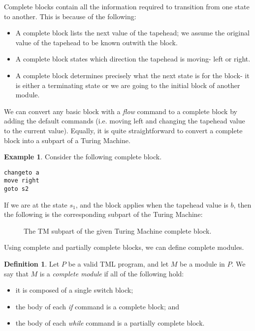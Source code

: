\documentclass{article}
\theoremstyle{definition}
\newtheorem{definition}[rules]{Definition}
\newtheorem{example}[rules]{Example}
\theoremstyle{plain}
\begin{document}
Complete blocks contain all the information required to transition from one state to another. This is because of the following:
\begin{itemize}
    \item A complete block lists the next value of the tapehead; we assume the original value of the tapehead to be known outwith the block.
    \item A complete block states which direction the tapehead is moving- left or right.
    \item A complete block determines precisely what the next state is for the block- it is either a terminating state or we are going to the initial block of another module.
\end{itemize}        
We can convert any basic block with a \textit{flow} command to a complete block by adding the default commands (i.e. moving left and changing the tapehead value to the current value). Equally, it is quite straightforward to convert a complete block into a subpart of a Turing Machine.
\begin{example}
    Consider the following complete block.
\begin{lstlisting}[language=TML]
changeto a
move right
goto s2
\end{lstlisting}
    \noindent If we are at the state $s_1$, and the block applies when the tapehead value is $b$, then the following is the corresponding subpart of the Turing Machine:
    \begin{figure}[H]
        \centering
        \caption{The TM subpart of the given Turing Machine complete block.}
    \end{figure}            
\end{example}

Using complete and partially complete blocks, we can define complete modules.
\begin{definition}
    Let $P$ be a valid TML program, and let $M$ be a module in $P$. We say that $M$ is a \emph{complete module} if all of the following hold:
    \begin{itemize}
        \item it is composed of a single switch block;
        \item the body of each \textit{if} command is a complete block; and
        \item the body of each \textit{while} command is a partially complete block.
    \end{itemize}
\end{definition}
\end{document}
